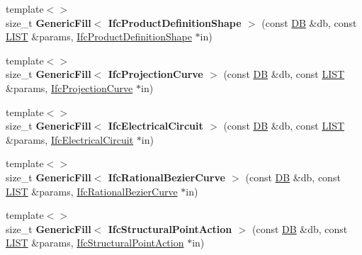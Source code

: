 \begin{DoxyCompactItemize}
\item 
\hypertarget{namespace_assimp_1_1_s_t_e_p_a3403d277205dbc523018ef0b1305a154}{{\footnotesize template$<$$>$ }\\size\+\_\+t {\bfseries Generic\+Fill$<$ Ifc\+Product\+Definition\+Shape $>$} (const \hyperlink{class_assimp_1_1_s_t_e_p_1_1_d_b}{D\+B} \&db, const \hyperlink{class_assimp_1_1_s_t_e_p_1_1_e_x_p_r_e_s_s_1_1_l_i_s_t}{L\+I\+S\+T} \&params, \hyperlink{struct_assimp_1_1_i_f_c_1_1_ifc_product_definition_shape}{Ifc\+Product\+Definition\+Shape} $\ast$in)}\label{namespace_assimp_1_1_s_t_e_p_a3403d277205dbc523018ef0b1305a154}

\item 
\hypertarget{namespace_assimp_1_1_s_t_e_p_a6954a43a348fd2b4cb4cb422352422f5}{{\footnotesize template$<$$>$ }\\size\+\_\+t {\bfseries Generic\+Fill$<$ Ifc\+Projection\+Curve $>$} (const \hyperlink{class_assimp_1_1_s_t_e_p_1_1_d_b}{D\+B} \&db, const \hyperlink{class_assimp_1_1_s_t_e_p_1_1_e_x_p_r_e_s_s_1_1_l_i_s_t}{L\+I\+S\+T} \&params, \hyperlink{struct_assimp_1_1_i_f_c_1_1_ifc_projection_curve}{Ifc\+Projection\+Curve} $\ast$in)}\label{namespace_assimp_1_1_s_t_e_p_a6954a43a348fd2b4cb4cb422352422f5}

\item 
\hypertarget{namespace_assimp_1_1_s_t_e_p_a656ba0af2af2798671cc705278fbc15b}{{\footnotesize template$<$$>$ }\\size\+\_\+t {\bfseries Generic\+Fill$<$ Ifc\+Electrical\+Circuit $>$} (const \hyperlink{class_assimp_1_1_s_t_e_p_1_1_d_b}{D\+B} \&db, const \hyperlink{class_assimp_1_1_s_t_e_p_1_1_e_x_p_r_e_s_s_1_1_l_i_s_t}{L\+I\+S\+T} \&params, \hyperlink{struct_assimp_1_1_i_f_c_1_1_ifc_electrical_circuit}{Ifc\+Electrical\+Circuit} $\ast$in)}\label{namespace_assimp_1_1_s_t_e_p_a656ba0af2af2798671cc705278fbc15b}

\item 
\hypertarget{namespace_assimp_1_1_s_t_e_p_a2fd33e61b856ec9e221369d54b276f30}{{\footnotesize template$<$$>$ }\\size\+\_\+t {\bfseries Generic\+Fill$<$ Ifc\+Rational\+Bezier\+Curve $>$} (const \hyperlink{class_assimp_1_1_s_t_e_p_1_1_d_b}{D\+B} \&db, const \hyperlink{class_assimp_1_1_s_t_e_p_1_1_e_x_p_r_e_s_s_1_1_l_i_s_t}{L\+I\+S\+T} \&params, \hyperlink{struct_assimp_1_1_i_f_c_1_1_ifc_rational_bezier_curve}{Ifc\+Rational\+Bezier\+Curve} $\ast$in)}\label{namespace_assimp_1_1_s_t_e_p_a2fd33e61b856ec9e221369d54b276f30}

\item 
\hypertarget{namespace_assimp_1_1_s_t_e_p_a9193036b209138bc9bc2e149fa8692a3}{{\footnotesize template$<$$>$ }\\size\+\_\+t {\bfseries Generic\+Fill$<$ Ifc\+Structural\+Point\+Action $>$} (const \hyperlink{class_assimp_1_1_s_t_e_p_1_1_d_b}{D\+B} \&db, const \hyperlink{class_assimp_1_1_s_t_e_p_1_1_e_x_p_r_e_s_s_1_1_l_i_s_t}{L\+I\+S\+T} \&params, \hyperlink{struct_assimp_1_1_i_f_c_1_1_ifc_structural_point_action}{Ifc\+Structural\+Point\+Action} $\ast$in)}\label{namespace_assimp_1_1_s_t_e_p_a9193036b209138bc9bc2e149fa8692a3}


\end{DoxyCompactItemize}
